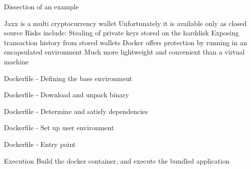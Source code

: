 \documentclass[11pt]{beamer}
\begin{document}
\begin{frame}{Dissection of an example}
\begin{outline}
\1 Jaxx is a multi cryptocurrency wallet
\1 Unfortunately it is available only as closed source
\1 Risks include:
  \2 Stealing of private keys stored on the harddisk
  \2 Exposing transaction history from stored wallets
\1 Docker offers protection by running in an encapsulated environment
\1 Much more lightweight and convenient than a virtual machine
\end{outline}
\end{frame}

\begin{frame}{Dockerfile - Defining the base environment} 

\end{frame}

\begin{frame}{Dockerfile - Download and unpack binary} 

\end{frame}

\begin{frame}{Dockerfile - Determine and satisfy dependencies} 

\end{frame}

\begin{frame}{Dockerfile - Set up user environment} 

\end{frame}

\begin{frame}{Dockerfile - Entry point} 

\end{frame}

\begin{frame}{Execution} 
Build the docker container, and execute the bundled application

\end{frame}
\end{document}
